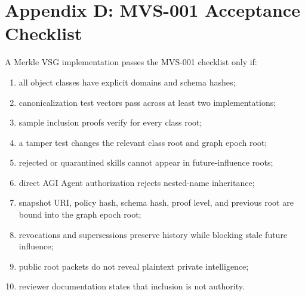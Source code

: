 \documentclass[11pt,letterpaper]{article}
\begin{document}
\section*{Appendix D: MVS-001 Acceptance Checklist}
A Merkle VSG implementation passes the MVS-001 checklist only if:
\begin{enumerate}
\item all object classes have explicit domains and schema hashes;
\item canonicalization test vectors pass across at least two implementations;
\item sample inclusion proofs verify for every class root;
\item a tamper test changes the relevant class root and graph epoch root;
\item rejected or quarantined skills cannot appear in future-influence roots;
\item direct AGI Agent authorization rejects nested-name inheritance;
\item snapshot URI, policy hash, schema hash, proof level, and previous root are bound into the graph epoch root;
\item revocations and supersessions preserve history while blocking stale future influence;
\item public root packets do not reveal plaintext private intelligence;
\item reviewer documentation states that inclusion is not authority.
\end{enumerate}
\end{document}
